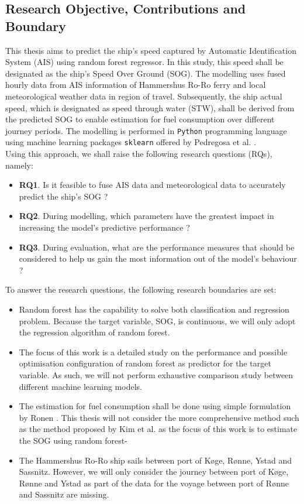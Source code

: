 \subsection{Research Objective, Contributions and Boundary}\label{objectives}

This thesis aims to predict the ship's speed captured by Automatic Identification System (AIS) using random forest regressor. In this study, this speed shall be designated as the ship's Speed Over Ground (SOG). The modelling uses fused hourly data from AIS information of Hammershus Ro-Ro ferry and local meteorological weather data in region of travel. Subsequently, the ship actual speed, which is designated as speed through water (STW), shall be derived from the predicted SOG to enable estimation for fuel consumption over different journey periods. The modelling is performed in {\tt Python} programming language using machine learning packages {\tt sklearn} offered by Pedregosa et al. \cite{FabianPedregosa.2011}. \\

Using this approach, we shall raise the following research questions (RQs), namely:

\begin{itemize}
    \item \textbf{RQ1}. Is it feasible to fuse AIS data and meteorological data to accurately predict the ship's SOG ?
    \item \textbf{RQ2}. During modelling, which parameters have the greatest impact in increasing the model's predictive performance ?
    \item \textbf{RQ3}. During evaluation, what are the performance measures that should be considered to help us gain the most information out of the model's behaviour ?
\end{itemize} 

To answer the research questions, the following research boundaries are set:

\begin{itemize}
    \item Random forest has the capability to solve both classification and regression problem. Because the target variable, SOG, is continuous, we will only adopt the regression algorithm of random forest.
    \item The focus of this work is a detailed study on the performance and possible optimisation configuration of random forest as predictor for the target variable. As such, we will not perform exhaustive comparison study between different machine learning models.
    \item The estimation for fuel consumption shall be done using simple formulation by Ronen \cite{Ronen.1982,Ronen.2011}. This thesis will not consider the more comprehensive method such as the method proposed by Kim et al. \cite{Kim.2020} as the focus of this work is to estimate the SOG using random forest-
    \item The Hammershus Ro-Ro ship sails between port of K{\o}ge, R{\o}nne, Ystad and Sassnitz. However, we will only consider the journey between port of K{\o}ge, R{\o}nne and Ystad as part of the data for the voyage between port of R{\o}nne and Sassnitz are missing. 
\end{itemize}

